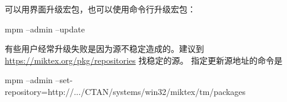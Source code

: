 
\MiKTeX{}
可以用界面升级宏包，也可以使用命令行升级宏包：
\begin{shcode}
mpm --admin --update
\end{shcode}

有些用户经常升级失败是因为源不稳定造成的。建议到
\url{https://miktex.org/pkg/repositories} 找稳定的源。
指定更新源地址的命令是
\begin{shcode}
mpm --admin --set-repository=http://.../CTAN/systems/win32/miktex/tm/packages
\end{shcode}

%
%
%
%
%
%
%



